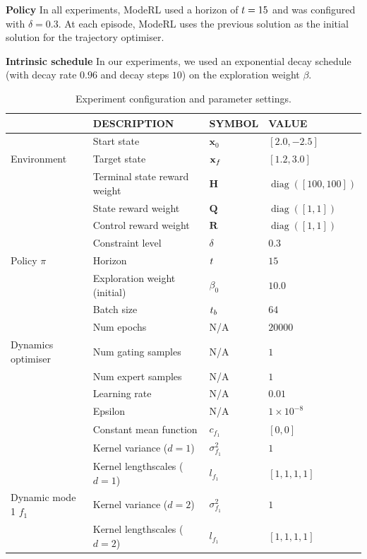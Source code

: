 \documentclass[twoside]{article}
\newcommand{\numData}{\ensuremath{t}}
\newcommand{\NumData}{\ensuremath{\MakeUppercase{\numData}}}
\newcommand{\state}{\ensuremath{\mathbf{x}}}
\newcommand{\diag}{\mathop{\mathrm{diag}}}
\begin{document}
\textbf{Policy}
In all experiments, ModeRL used a horizon of \(\relax{\ensuremath{t}}=15\) and was configured with \(\delta=0.3\).
At each episode, ModeRL uses the previous solution as the initial solution for the trajectory optimiser.

\textbf{Intrinsic schedule}
In our experiments, we used an exponential decay schedule (with decay rate \(0.96\) and decay steps \(10\)) on the exploration weight \(\beta\).

\begin{table}[htbp]
\caption{\label{tab:orgfb5725e}Experiment configuration and parameter settings.}
\centering
\begin{tabular}{llll}
 & \textbf{DESCRIPTION} & \textbf{SYMBOL} & \textbf{VALUE}\\
\hline
 & Start state & \(\state_{0}\) & \([2.0, -2.5]\)\\
Environment & Target state & \(\targetState\) & \([1.2, 3.0]\)\\
 & Terminal state reward weight & \(\mathbf{H}\) & \(\diag([100, 100])\)\\
 & State reward weight & \(\mathbf{Q}\) & \(\diag([1, 1])\)\\
 & Control reward weight & \(\mathbf{R}\) & \(\diag([1, 1])\)\\
\hline
 & Constraint level & \(\delta\) & \(0.3\)\\
Policy \(\pi\) & Horizon & \(\relax{\ensuremath{t}}\) & \(15\)\\
 & Exploration weight (initial) & \(\beta_{0}\) & \(10.0\)\\
\hline
 & Batch size & \(\NumData_b\) & \(64\)\\
 & Num epochs & N/A & \(20000\)\\
Dynamics optimiser & Num gating samples & N/A & \(1\)\\
 & Num expert samples & N/A & \(1\)\\
 & Learning rate & N/A & \(0.01\)\\
 & Epsilon & N/A & \(1\times 10^{-8}\)\\
\hline
 & Constant mean function & \(c_{f_{1}}\) & \([0, 0]\)\\
 & Kernel variance (\(d=1\)) & \(\sigma^{2}_{f_{1}}\) & \(1\)\\
 & Kernel lengthscales  (\(d=1\)) & \(l_{f_{1}}\) & \([1, 1, 1, 1]\)\\
Dynamic mode 1 \(f_{1}\) & Kernel variance (\(d=2\)) & \(\sigma^{2}_{f_{1}}\) & \(1\)\\
 & Kernel lengthscales (\(d=2\)) & \(l_{f_{1}}\) & \([1, 1, 1, 1]\)\\

\end{tabular}
\end{table}
\end{document}
